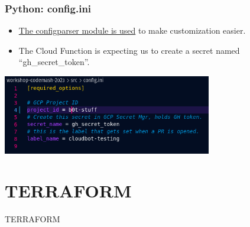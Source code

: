 \documentclass[aspectratio=169]{beamer}
\begin{document}
\begin{frame}
	\frametitle{Python: config.ini}

	\begin{itemize}
		\item \href{https://docs.python.org/3/library/configparser.html\#module-configparser}{The configparser module is used} to make customization easier.
		\item The Cloud Function is expecting us to create a secret named ``gh\_secret\_token''.
	\end{itemize}
	\vspace{2mm}

	\begin{center}
		\includegraphics[width=0.685\textwidth]{../images/config.ini.png}
	\end{center}
\end{frame}



\section{TERRAFORM}
\begin{frame}
	\Huge \textcolor{dgreen}{TERRAFORM}
\end{frame}
\end{document}
